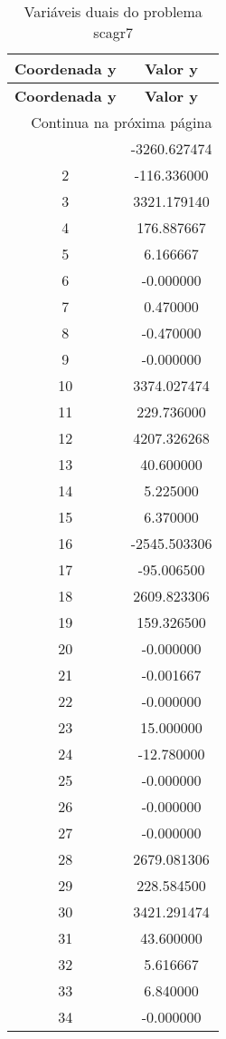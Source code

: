 \documentclass[12pt]{article}
\begin{document}
\begin{longtable}{@{}cc@{}}
\caption{Variáveis duais do problema scagr7} \\
\toprule
\textbf{Coordenada y} & \textbf{Valor y} \\
\midrule
\endfirsthead

\toprule
\textbf{Coordenada y} & \textbf{Valor y} \\
\midrule
\endhead

\midrule \multicolumn{2}{r}{{Continua na próxima página}} \\ \midrule
\endfoot

\bottomrule
\endlastfoot
1 & -3260.627474 \\
2 & -116.336000 \\
3 & 3321.179140 \\
4 & 176.887667 \\
5 & 6.166667 \\
6 & -0.000000 \\
7 & 0.470000 \\
8 & -0.470000 \\
9 & -0.000000 \\
10 & 3374.027474 \\
11 & 229.736000 \\
12 & 4207.326268 \\
13 & 40.600000 \\
14 & 5.225000 \\
15 & 6.370000 \\
16 & -2545.503306 \\
17 & -95.006500 \\
18 & 2609.823306 \\
19 & 159.326500 \\
20 & -0.000000 \\
21 & -0.001667 \\
22 & -0.000000 \\
23 & 15.000000 \\
24 & -12.780000 \\
25 & -0.000000 \\
26 & -0.000000 \\
27 & -0.000000 \\
28 & 2679.081306 \\
29 & 228.584500 \\
30 & 3421.291474 \\
31 & 43.600000 \\
32 & 5.616667 \\
33 & 6.840000 \\
34 & -0.000000 \\

\end{longtable}
\end{document}
